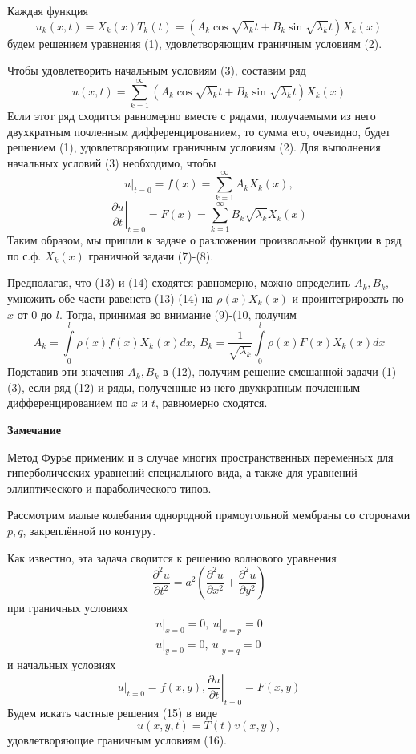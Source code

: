 \begin{enumerate}
Каждая функция
\[
	u_k(x,t) = X_k(x) T_k(t) = \left( A_k \cos \sqrt{\lambda_k} t + B_k \sin \sqrt{\lambda_k} t\right)X_k (x)
\]
будем решением уравнения (1), удовлетворяющим граничным условиям (2).

Чтобы удовлетворить начальным условиям (3), составим ряд
\[
	u(x,t) = \sum_{k=1}^\infty \left( A_k \cos \sqrt{\lambda_k} t + B_k \sin \sqrt{\lambda_k} t\right) X_k (x)\tag{12}
\]
Если этот ряд сходится равномерно вместе с рядами, получаемыми из него двухкратным почленным дифференцированием, то сумма его, очевидно, будет решением (1), удовлетворяющим граничным условиям (2). Для выполнения начальных условий (3) необходимо, чтобы
\[
	\left. u\right|_{t=0} = f(x) = \sum_{k=1}^\infty A_k X_k (x), \tag{13}
\]
\[
	\left. \frac{\partial u}{\partial t}\right|_{t=0} = F(x) = \sum_{k=1}^\infty B_k \sqrt{\lambda_k} X_k (x) \tag{14}
\]
Таким образом, мы пришли к задаче о разложении произвольной функции в ряд по с.ф. $X_k(x)$ граничной задачи (7)-(8).

Предполагая, что (13) и (14) сходятся равномерно, можно определить $A_k, B_k$, умножить обе части равенств (13)-(14) на $\rho(x) X_k(x)$ и проинтегрировать по $x$ от $0$ до $l$. Тогда, принимая во внимание (9)-(10, получим
\[
	A_k = \int\limits_0^l \rho(x) f(x) X_k (x) dx, ~ B_k = \frac{1}{\sqrt{\lambda_k}} \int\limits_0^l \rho(x) F(x) X_k(x)dx
\]
Подставив эти значения $A_k, B_k$ в (12), получим решение смешанной задачи (1)-(3), если ряд (12) и ряды, полученные из него двухкратным почленным дифференцированием по $x$ и $t$, равномерно сходятся.

\textbf{Замечание}

Метод Фурье применим и в случае многих пространственных переменных для гиперболических уравнений специального вида, а также для уравнений эллиптического и параболического типов.

Рассмотрим малые колебания однородной прямоугольной мембраны со сторонами $p, q$, закреплённой по контуру.

Как известно, эта задача сводится к решению волнового уравнения
\[
	\frac{\partial^2 u}{\partial t^2} = a^2 \left( \frac{\partial^2 u}{\partial x^2} + \frac{\partial^2 u}{\partial y^2}\right) \tag{15}
\]
при граничных условиях
\[
	\begin{aligned}
		\left. u\right|_{x=0} = 0, ~ \left. u\right|_{x=p} = 0 \\
				\left. u\right|_{y=0} = 0, ~ \left. u\right|_{y=q} = 0
					\end{aligned} \tag{16}
\]
и начальных условиях
\[
	\left. u\right|_{t=0} = f(x,y), \left. \frac{\partial u}{\partial t}\right|_{t=0} = F(x,y) \tag{17}
\]
Будем искать частные решения (15) в виде
\[
	u(x,y,t) = T(t) v(x,y), \tag{18}
\]
удовлетворяющие граничным условиям (16).


\end{enumerate}
